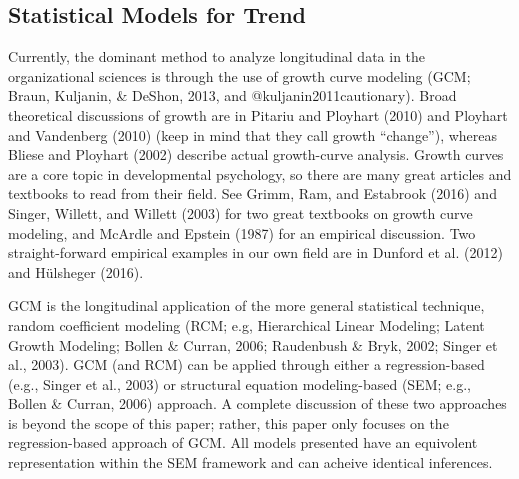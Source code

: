 \documentclass[english,,man]{apa6}
\theoremstyle{definition}
\theoremstyle{definition}
\theoremstyle{definition}
\theoremstyle{remark}
\begin{document}
\hypertarget{statistical-models-for-trend}{%
\subsection{Statistical Models for
Trend}\label{statistical-models-for-trend}}

Currently, the dominant method to analyze longitudinal data in the
organizational sciences is through the use of growth curve modeling
(GCM; Braun, Kuljanin, \& DeShon, 2013, and @kuljanin2011cautionary).
Broad theoretical discussions of growth are in Pitariu and Ployhart
(2010) and Ployhart and Vandenberg (2010) (keep in mind that they call
growth \enquote{change}), whereas Bliese and Ployhart (2002) describe
actual growth-curve analysis. Growth curves are a core topic in
developmental psychology, so there are many great articles and textbooks
to read from their field. See Grimm, Ram, and Estabrook (2016) and
Singer, Willett, and Willett (2003) for two great textbooks on growth
curve modeling, and McArdle and Epstein (1987) for an empirical
discussion. Two straight-forward empirical examples in our own field are
in Dunford et al. (2012) and Hülsheger (2016).

GCM is the longitudinal application of the more general statistical
technique, random coefficient modeling (RCM; e.g, Hierarchical Linear
Modeling; Latent Growth Modeling; Bollen \& Curran, 2006; Raudenbush \&
Bryk, 2002; Singer et al., 2003). GCM (and RCM) can be applied through
either a regression-based (e.g., Singer et al., 2003) or structural
equation modeling-based (SEM; e.g., Bollen \& Curran, 2006) approach. A
complete discussion of these two approaches is beyond the scope of this
paper; rather, this paper only focuses on the regression-based approach
of GCM. All models presented have an equivolent representation within
the SEM framework and can acheive identical inferences.
\end{document}
